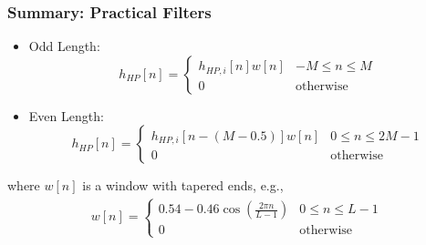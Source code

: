 \documentclass{beamer}
\begin{document}
\begin{frame}
  \frametitle{Summary: Practical Filters}
  \begin{itemize}
  \item Odd Length:
    \[
    h_{HP}[n] = \begin{cases}
      h_{HP,i}[n]w[n] & -M\le n\le M\\
      0 & \mbox{otherwise}
    \end{cases}
    \]
  \item Even Length:
    \[
    h_{HP}[n] = \begin{cases}
      h_{HP,i}\left[n-(M-0.5)\right]w[n] & 0\le n\le 2M-1\\
      0 & \mbox{otherwise}
    \end{cases}
    \]
  \end{itemize}
  where $w[n]$ is a window with tapered ends, e.g.,
  \begin{align*}
    w[n] = \begin{cases}
      0.54-0.46\cos\left(\frac{2\pi n}{L-1}\right) & 0\le n\le L-1\\
      0 &\mbox{otherwise}\end{cases}
  \end{align*}
\end{frame}
\end{document}
